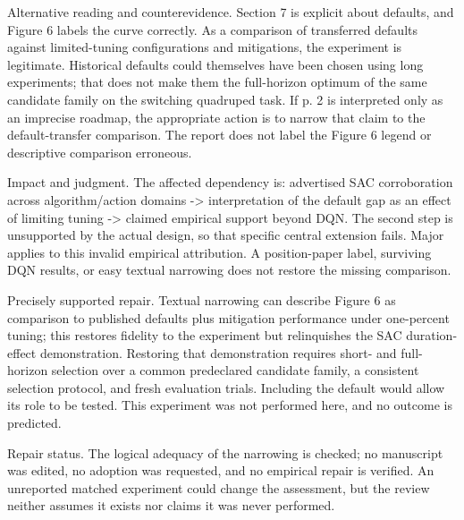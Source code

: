 \documentclass[10pt]{article}
\begin{document}
Alternative reading and counterevidence. Section 7 is explicit about defaults, and Figure 6 labels the curve correctly. As a comparison of transferred defaults against limited-tuning configurations and mitigations, the experiment is legitimate. Historical defaults could themselves have been chosen using long experiments; that does not make them the full-horizon optimum of the same candidate family on the switching quadruped task. If p. 2 is interpreted only as an imprecise roadmap, the appropriate action is to narrow that claim to the default-transfer comparison. The report does not label the Figure 6 legend or descriptive comparison erroneous.\par
Impact and judgment. The affected dependency is: advertised SAC corroboration across algorithm/action domains -> interpretation of the default gap as an effect of limiting tuning -> claimed empirical support beyond DQN. The second step is unsupported by the actual design, so that specific central extension fails. Major applies to this invalid empirical attribution. A position-paper label, surviving DQN results, or easy textual narrowing does not restore the missing comparison.\par
Precisely supported repair. Textual narrowing can describe Figure 6 as comparison to published defaults plus mitigation performance under one-percent tuning; this restores fidelity to the experiment but relinquishes the SAC duration-effect demonstration. Restoring that demonstration requires short- and full-horizon selection over a common predeclared candidate family, a consistent selection protocol, and fresh evaluation trials. Including the default would allow its role to be tested. This experiment was not performed here, and no outcome is predicted.\par
Repair status. The logical adequacy of the narrowing is checked; no manuscript was edited, no adoption was requested, and no empirical repair is verified. An unreported matched experiment could change the assessment, but the review neither assumes it exists nor claims it was never performed.\par
\end{document}
